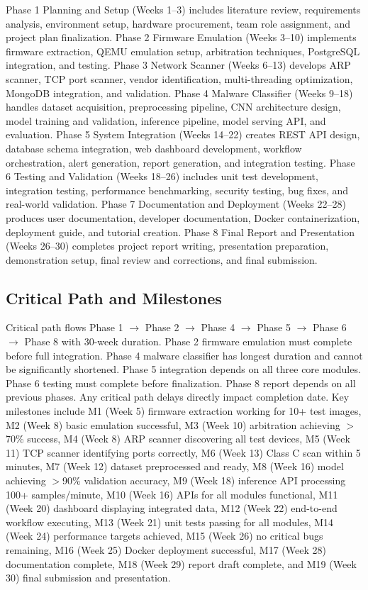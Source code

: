 Phase 1 Planning and Setup (Weeks 1--3) includes literature review, requirements analysis, environment setup, hardware procurement, team role assignment, and project plan finalization. Phase 2 Firmware Emulation (Weeks 3--10) implements firmware extraction, QEMU emulation setup, arbitration techniques, PostgreSQL integration, and testing. Phase 3 Network Scanner (Weeks 6--13) develops ARP scanner, TCP port scanner, vendor identification, multi-threading optimization, MongoDB integration, and validation. Phase 4 Malware Classifier (Weeks 9--18) handles dataset acquisition, preprocessing pipeline, CNN architecture design, model training and validation, inference pipeline, model serving API, and evaluation. Phase 5 System Integration (Weeks 14--22) creates REST API design, database schema integration, web dashboard development, workflow orchestration, alert generation, report generation, and integration testing. Phase 6 Testing and Validation (Weeks 18--26) includes unit test development, integration testing, performance benchmarking, security testing, bug fixes, and real-world validation. Phase 7 Documentation and Deployment (Weeks 22--28) produces user documentation, developer documentation, Docker containerization, deployment guide, and tutorial creation. Phase 8 Final Report and Presentation (Weeks 26--30) completes project report writing, presentation preparation, demonstration setup, final review and corrections, and final submission.

\subsection{Critical Path and Milestones}

Critical path flows Phase 1 $\rightarrow$ Phase 2 $\rightarrow$ Phase 4 $\rightarrow$ Phase 5 $\rightarrow$ Phase 6 $\rightarrow$ Phase 8 with 30-week duration. Phase 2 firmware emulation must complete before full integration. Phase 4 malware classifier has longest duration and cannot be significantly shortened. Phase 5 integration depends on all three core modules. Phase 6 testing must complete before finalization. Phase 8 report depends on all previous phases. Any critical path delays directly impact completion date. Key milestones include M1 (Week 5) firmware extraction working for 10+ test images, M2 (Week 8) basic emulation successful, M3 (Week 10) arbitration achieving $>$70\% success, M4 (Week 8) ARP scanner discovering all test devices, M5 (Week 11) TCP scanner identifying ports correctly, M6 (Week 13) Class C scan within 5 minutes, M7 (Week 12) dataset preprocessed and ready, M8 (Week 16) model achieving $>$90\% validation accuracy, M9 (Week 18) inference API processing 100+ samples/minute, M10 (Week 16) APIs for all modules functional, M11 (Week 20) dashboard displaying integrated data, M12 (Week 22) end-to-end workflow executing, M13 (Week 21) unit tests passing for all modules, M14 (Week 24) performance targets achieved, M15 (Week 26) no critical bugs remaining, M16 (Week 25) Docker deployment successful, M17 (Week 28) documentation complete, M18 (Week 29) report draft complete, and M19 (Week 30) final submission and presentation.

